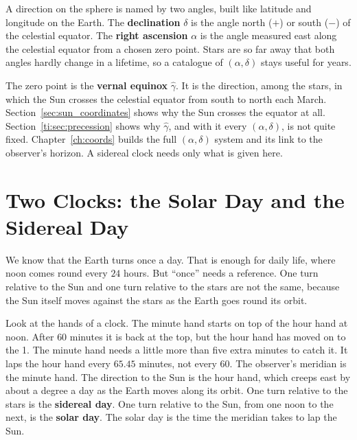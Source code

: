 A direction on the sphere is named by two angles, built like latitude and longitude on the Earth. The \textbf{declination} $\delta$ is the angle north ($+$) or south ($-$) of the celestial equator. The \textbf{right ascension} $\alpha$ is the angle measured east along the celestial equator from a chosen zero point. Stars are so far away that both angles hardly change in a lifetime, so a catalogue of $(\alpha,\delta)$ stays useful for years.

The zero point is the \textbf{vernal equinox} $\hat\gamma$. It is the direction, among the stars, in which the Sun crosses the celestial equator from south to north each March. Section~\ref{sec:sun_coordinates} shows why the Sun crosses the equator at all. Section~\ref{ti:sec:precession} shows why $\hat\gamma$, and with it every $(\alpha,\delta)$, is not quite fixed. Chapter~\ref{ch:coords} builds the full $(\alpha,\delta)$ system and its link to the observer's horizon. A sidereal clock needs only what is given here.

\section{Two Clocks: the Solar Day and the Sidereal Day}
\label{sec:solar_sidereal_day}

We know that the Earth turns once a day. That is enough for daily life, where noon comes round every $24$ hours. But ``once'' needs a reference. One turn relative to the Sun and one turn relative to the stars are not the same, because the Sun itself moves against the stars as the Earth goes round its orbit.

Look at the hands of a clock. The minute hand starts on top of the hour hand at noon. After $60$ minutes it is back at the top, but the hour hand has moved on to the 1. The minute hand needs a little more than five extra minutes to catch it. It laps the hour hand every $65.45$ minutes, not every $60$. The observer's meridian is the minute hand. The direction to the Sun is the hour hand, which creeps east by about a degree a day as the Earth moves along its orbit. One turn relative to the stars is the \textbf{sidereal day}. One turn relative to the Sun, from one noon to the next, is the \textbf{solar day}. The solar day is the time the meridian takes to lap the Sun.

